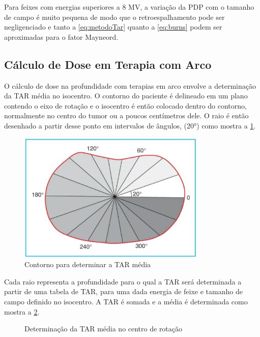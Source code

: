 \documentclass[11pt,a4paper]{article}
\begin{document}
	Para feixes com energias superiores a 8 MV, a variação da PDP com o tamanho de campo é muito pequena de modo que o retroespalhamento pode ser negligenciado e tanto a  \ref{eq:metodoTar} quanto a \ref{eq:burns} podem ser aproximadas para o fator Mayneord.

	\subsection{Cálculo de Dose em Terapia com Arco}

	O cálculo de dose na profundidade com terapias em arco envolve a determinação da TAR média no isocentro. O contorno do paciente é delineado em um plano contendo o eixo de rotação e o isocentro é então colocado dentro do contorno, normalmente no centro do tumor ou a poucos centímetros dele. O raio é então desenhado a partir desse ponto em intervalos de ângulos, (\ang{20}) como mostra a \ref{fig:tarArco}. 

	\begin{figure}[h]
		\centering
		\includegraphics[width=0.8\textwidth]{Imagens/tarArco.JPG}
		\caption{Contorno para determinar a TAR média}
		\label{fig:tarArco}                
	\end{figure}

	Cada raio representa a profundidade para o qual a TAR será determinada a partir de uma tabela de TAR, para uma dada energia de feixe e tamanho de campo definido no isocentro. A TAR é somada e a média é determinada como mostra a \ref{fig:tabelaTarArco}.


	\begin{figure}[h]
		\centering
		\caption{Determinação da TAR média no centro de rotação}
		\label{fig:tabelaTarArco}
	  \end{figure}
\end{document}
